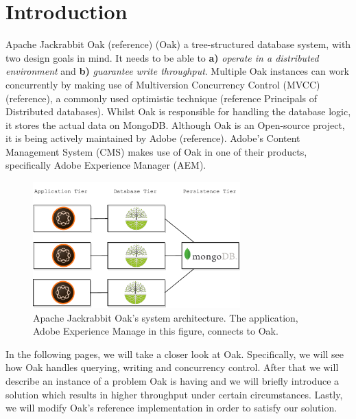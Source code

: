 \documentclass[abstracton,12pt]{scrreprt}
\begin{document}
\newpage
\newpage

\chapter{Introduction}
 

Apache Jackrabbit Oak (reference) (Oak) a tree-structured database system, with two design goals in mind.
It needs to be able to \textbf{a)} \textit{operate in a distributed environment} and \textbf{b)} \textit{guarantee write throughput}.
Multiple Oak instances can work concurrently by making use of Multiversion Concurrency Control (MVCC) (reference), a commonly used optimistic technique (reference Principals of Distributed databases).
Whilst Oak is responsible for handling the database logic, it stores the actual data on MongoDB.
Although Oak is an Open-source project, it is being actively maintained by Adobe (reference).
Adobe's Content Management System (CMS) makes use of Oak in one of their products, specifically Adobe Experience Manager (AEM).

\begin{figure}[h]
    \centering
    \includegraphics[width=8cm]{architecture}
    \caption{Apache Jackrabbit Oak's system architecture. The application, Adobe Experience Manage in this figure, connects to Oak.}
    \label{fig:architecture}
\end{figure}

In the following pages, we will take a closer look at Oak.
Specifically, we will see how Oak handles querying, writing and concurrency control.
After that we will describe an instance of a problem Oak is having and we will briefly introduce a solution which results in higher throughput under certain circumstances.
Lastly, we will modify Oak's reference implementation in order to satisfy our solution.
\end{document}

